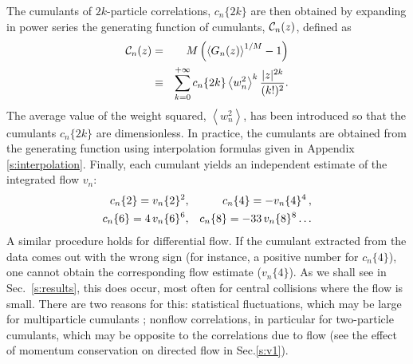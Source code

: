 \documentclass[aps,prc,superscriptaddress,showpacs,floatfix,nofootinbib]{revtex4}
\newcommand{\mean}[1]{\left\langle #1 \right\rangle}
\begin{document}
The cumulants of $2k$-particle correlations, $c_n\{2k\}$ are 
then obtained by expanding in power series the generating function of 
cumulants, ${\cal C}_n(z)$, defined as 
\begin{eqnarray}
\label{gencum}
{\cal C}_n(z) &=& M\left( \mean{G_n(z)}^{1/M} -1 \right) \cr
 & \equiv & \sum_{k=0}^{+\infty} c_n\{2k\}\mean{w_n^2}^k \frac{|z|^{2k}}{(k!)^2}.
\end{eqnarray}
The average value of the weight squared, $\mean{w_n^2}$, has been
introduced so that the cumulants $c_n\{2k\}$ are dimensionless.  In
practice, the cumulants are obtained from the generating function
using interpolation formulas given in Appendix \ref{s:interpolation}.
Finally, each cumulant yields an independent estimate of the
integrated flow $v_n$:
\begin{eqnarray}
\label{flow&cumul-int}
c_n\{2\} = v_n\{2\}^2 &,& c_n\{4\} = -v_n\{4\}^4 \,,  \cr
c_n\{6\} = 4\,v_n\{6\}^6 &,& c_n\{8\} = -33\,v_n\{8\}^8 \ldots
\end{eqnarray} 
A similar procedure holds for differential flow.  If the cumulant
extracted from the data comes out with the wrong sign (for instance, a
positive number for $c_n\{4\}$), one cannot obtain the corresponding
flow estimate ($v_n\{4\}$).  As we shall see in Sec.~\ref{s:results},
this does occur, most often for central collisions where the flow is
small.  There are two reasons for this: statistical fluctuations,
which may be large for multiparticle cumulants
\cite{Borghini:2001vi}; nonflow correlations, in particular 
for two-particle cumulants, which may be opposite to the correlations
due to flow (see the effect of momentum conservation 
on directed flow in Sec.\ref{s:v1}).
\end{document}

